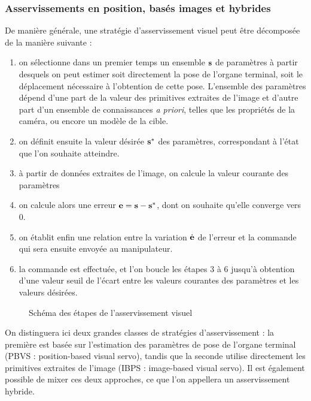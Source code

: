 \subsubsection{Asservissements en position, basés images et hybrides} 
\label{chap0-3-1-1}

De manière générale, une stratégie d'asservissement visuel peut être décomposée 
de la manière suivante :
\begin{enumerate}
 \item on sélectionne dans un premier temps un ensemble ${\bf s}$ de paramètres 
à partir desquels on peut estimer soit directement la pose de l'organe terminal, 
soit le déplacement nécessaire à l'obtention de cette pose. L'ensemble des 
paramètres dépend d'une part de la valeur des primitives extraites de l'image et 
d'autre part d'un ensemble de connaissances {\it a priori}, telles que les 
propriétés de la caméra, ou encore un modèle de la cible.
 \item on définit ensuite la valeur désirée ${\bf s}^*$ des paramètres, 
correspondant à l'état que l'on souhaite atteindre.
 \item à partir de données extraites de l'image, on calcule la valeur courante 
des paramètres
 \item on calcule alors une erreur ${\bf e} = {\bf s} - {\bf s}^*$, dont on 
souhaite qu'elle converge vers $0$.
 \item on établit enfin une relation entre la variation $\dot {\bf e}$ de 
l'erreur et la commande qui sera ensuite envoyée au manipulateur.
 \item la commande est effectuée, et l'on boucle les étapes $3$ à $6$ jusqu'à 
obtention d'une valeur seuil de l'écart entre les valeurs courantes des 
paramètres et les valeurs désirées.
\end{enumerate}

\begin{figure}[htp]
  \centering
    \def\svgwidth{.95\linewidth}
  
    \caption{\footnotesize{Schéma des étapes de l'asservissement visuel}}
\label{intro:fig13b}
\end{figure}

On distinguera ici deux grandes classes de stratégies d'asservissement : la 
première est basée sur l'estimation des paramètres de pose de l'organe terminal 
(PBVS : position-based visual servo), tandis que la seconde utilise directement 
les primitives extraites de l'image (IBPS : image-based visual servo). Il est 
également possible de mixer ces deux approches, ce que l'on appellera un 
asservissement hybride.

